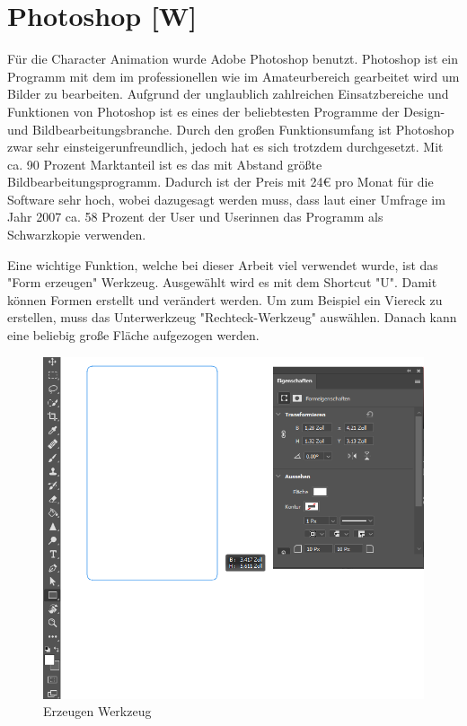 \newpage
\section{Photoshop [W]}
Für die Character Animation wurde Adobe Photoshop benutzt. Photoshop ist ein Programm mit dem 
im professionellen wie im Amateurbereich gearbeitet wird um Bilder zu bearbeiten. 
Aufgrund der unglaublich zahlreichen Einsatzbereiche und Funktionen von Photoshop ist es 
eines der beliebtesten Programme der Design- und Bildbearbeitungsbranche. 
Durch den großen Funktionsumfang ist Photoshop zwar sehr einsteigerunfreundlich, jedoch 
hat es sich trotzdem durchgesetzt. Mit ca. 90 Prozent Marktanteil ist es das mit Abstand größte
Bildbearbeitungsprogramm. Dadurch ist der Preis mit 24€ pro Monat für die Software sehr hoch, wobei dazugesagt werden muss,
dass laut einer Umfrage im Jahr 2007 ca. 58 Prozent der User und Userinnen das Programm als Schwarzkopie verwenden. 

Eine wichtige Funktion, welche bei dieser Arbeit viel verwendet wurde, ist das "Form erzeugen" Werkzeug. Ausgewählt wird es mit dem Shortcut "U". Damit können Formen erstellt und verändert werden. Um zum Beispiel ein Viereck zu erstellen, muss das Unterwerkzeug "Rechteck-Werkzeug" auswählen. Danach
kann eine beliebig große Fläche aufgezogen werden. 
\begin{figure}[H]
    \centering
    \includegraphics[scale=0.7]{pics/erzeugen.png}
    \caption{Erzeugen Werkzeug}
\end{figure}

